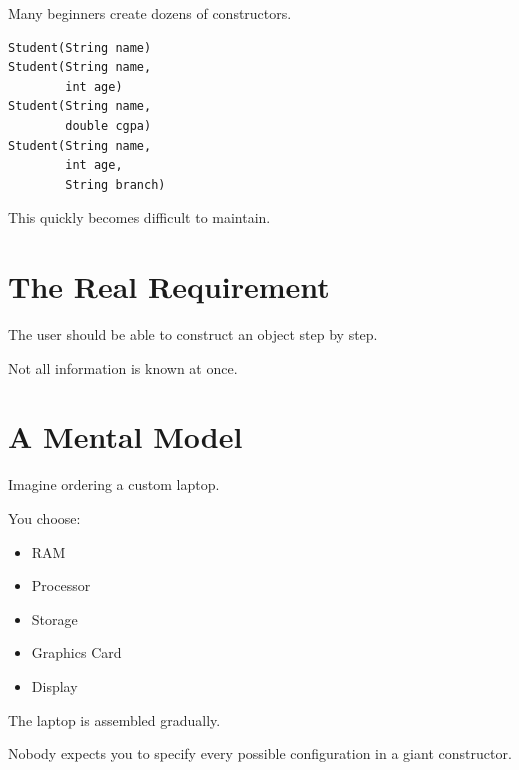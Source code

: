 \documentclass[11pt,a4paper]{book}
\begin{document}
Many beginners create dozens of constructors.

\begin{verbatim}
Student(String name)
Student(String name,
        int age)
Student(String name,
        double cgpa)
Student(String name,
        int age,
        String branch)
\end{verbatim}

This quickly becomes difficult to maintain.


\section{The Real Requirement}

\begin{idea}

The user should be able to construct an object
step by step.

Not all information is known at once.

\end{idea}


\section{A Mental Model}

\begin{mentalmodel}

Imagine ordering a custom laptop.

You choose:

\begin{itemize}

\item RAM
\item Processor
\item Storage
\item Graphics Card
\item Display
\end{itemize}

The laptop is assembled gradually.

Nobody expects you to specify every possible
configuration in a giant constructor.

\end{mentalmodel}

\end{document}
